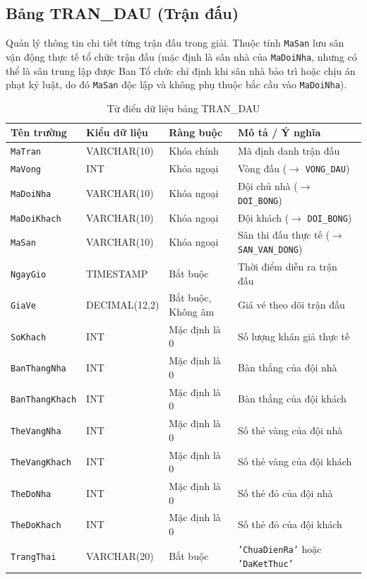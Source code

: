\subsection{Bảng TRAN\_DAU (Trận đấu)}
Quản lý thông tin chi tiết từng trận đấu trong giải. Thuộc tính \texttt{MaSan} lưu sân vận động thực tế tổ chức trận đấu (mặc định là sân nhà của \texttt{MaDoiNha}, nhưng có thể là sân trung lập được Ban Tổ chức chỉ định khi sân nhà bảo trì hoặc chịu án phạt kỷ luật, do đó \texttt{MaSan} độc lập và không phụ thuộc bắc cầu vào \texttt{MaDoiNha}).
\begin{table}[H]
\centering
\small
\begin{tabular}{|l|l|l|p{6cm}|}
\hline
\textbf{Tên trường} & \textbf{Kiểu dữ liệu} & \textbf{Ràng buộc} & \textbf{Mô tả / Ý nghĩa} \\ \hline
\texttt{MaTran} & VARCHAR(10) & Khóa chính & Mã định danh trận đấu \\ \hline
\texttt{MaVong} & INT & Khóa ngoại & Vòng đấu ($\rightarrow$ \texttt{VONG\_DAU}) \\ \hline
\texttt{MaDoiNha} & VARCHAR(10) & Khóa ngoại & Đội chủ nhà ($\rightarrow$ \texttt{DOI\_BONG}) \\ \hline
\texttt{MaDoiKhach} & VARCHAR(10) & Khóa ngoại & Đội khách ($\rightarrow$ \texttt{DOI\_BONG}) \\ \hline
\texttt{MaSan} & VARCHAR(10) & Khóa ngoại & Sân thi đấu thực tế ($\rightarrow$ \texttt{SAN\_VAN\_DONG}) \\ \hline
\texttt{NgayGio} & TIMESTAMP & Bắt buộc & Thời điểm diễn ra trận đấu \\ \hline
\texttt{GiaVe} & DECIMAL(12,2) & Bắt buộc, Không âm & Giá vé theo dõi trận đấu \\ \hline
\texttt{SoKhach} & INT & Mặc định là 0 & Số lượng khán giả thực tế \\ \hline
\texttt{BanThangNha} & INT & Mặc định là 0 & Bàn thắng của đội nhà \\ \hline
\texttt{BanThangKhach} & INT & Mặc định là 0 & Bàn thắng của đội khách \\ \hline
\texttt{TheVangNha} & INT & Mặc định là 0 & Số thẻ vàng của đội nhà \\ \hline
\texttt{TheVangKhach} & INT & Mặc định là 0 & Số thẻ vàng của đội khách \\ \hline
\texttt{TheDoNha} & INT & Mặc định là 0 & Số thẻ đỏ của đội nhà \\ \hline
\texttt{TheDoKhach} & INT & Mặc định là 0 & Số thẻ đỏ của đội khách \\ \hline
\texttt{TrangThai} & VARCHAR(20) & Bắt buộc & \texttt{'ChuaDienRa'} hoặc \texttt{'DaKetThuc'} \\ \hline
\end{tabular}
\caption{Từ điển dữ liệu bảng TRAN\_DAU}
\end{table}


